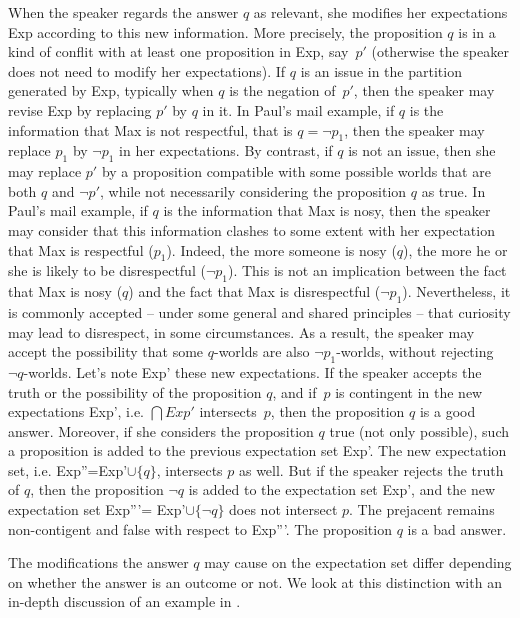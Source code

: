 \documentclass[output=paper,colorlinks,citecolor=brown,
]{langscibook}
\begin{document}
When the speaker regards the answer $q$  as relevant, she modifies her expectations Exp according to this new information.
More precisely, the proposition $q$ is in a kind of conflit with at least one proposition in Exp, say~$p'$ (otherwise the speaker does not need to modify her expectations). If $q$ is an issue in the partition generated by Exp,
typically when $q$ is the negation of~$p'$,
then the speaker
may revise Exp by replacing $p'$ by $q$ in it.
In Paul's mail example, if $q$ is the information that Max is not respectful, that is $q = \neg p_1$, then
the speaker may replace $p_1$ by
$\neg p_1$ in her expectations. By contrast, if $q$ is not an issue, then she may replace $p'$ by a proposition compatible with some possible worlds that are both $q$ and $\neg p'$, while not necessarily considering the proposition $q$ as true.
In Paul's mail example, if $q$ is the information that Max is nosy, then the speaker may consider that this information clashes to some extent with her expectation that Max is respectful ($p_1$). Indeed, the more someone is nosy ($q$), the more he or she is likely to be disrespectful ($\neg p_1$). This is not an implication between the fact that Max is nosy ($q$) and the fact that Max is disrespectful ($\neg p_1$). Nevertheless, it is commonly accepted -- under some general and shared principles -- that curiosity may lead to disrespect, in some circumstances. As a result, the speaker may accept the possibility that some $q$-worlds are also $\neg p_1$-worlds, without rejecting $\neg q$-worlds.
Let's note Exp' these new expectations.
If the speaker accepts the truth or the possibility of the proposition $q$, and if~$p$ is contingent in the new expectations Exp', i.e. $\bigcap Exp'$ intersects~$p$, then the proposition $q$ is a good answer.  %
Moreover, if she considers the proposition $q$ true (not only possible), such a proposition 
is added 
{to the previous expectation set Exp'. The new expectation set, i.e.  Exp''=Exp'$\cup \{q\}$, intersects $p$ as well.}
%
But if the speaker rejects the truth of $q$, then the proposition $\neg q$ is added to the expectation set Exp',
{and the new expectation set Exp'''= Exp'$\cup \{\neg q\}$ does not intersect $p$.}
The prejacent remains non-contigent and false with respect to  Exp'''. The proposition $q$ is a bad answer.


The modifications the answer $q$ may cause on the expectation set differ depending on whether the answer is an outcome or not. We look at this distinction with an in-depth discussion of an example in  .
\end{document}
